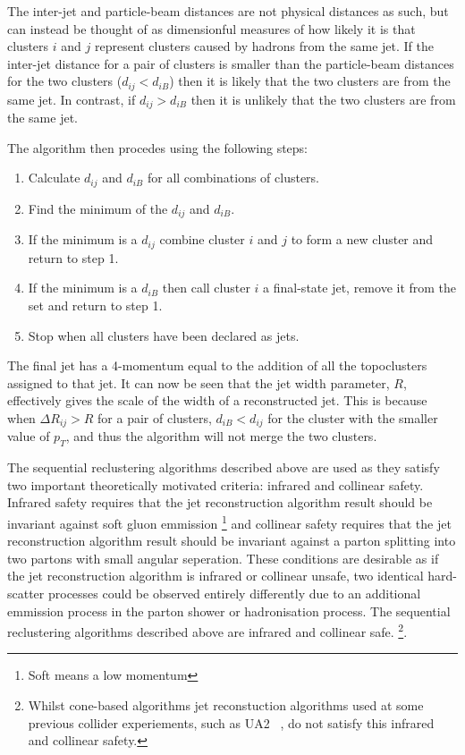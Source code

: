 The inter-jet and particle-beam distances are not physical distances as such, but can instead be thought of as dimensionful measures of how likely it is that
clusters $i$ and $j$ represent clusters caused by hadrons from the same jet.
If the inter-jet distance for a pair of clusters is smaller than the particle-beam distances for the two clusters ($d_{ij} < d_{iB}$) 
then it is likely that the two clusters are from the same jet. 
In contrast, if $d_{ij} > d_{iB}$ then it is unlikely that the two clusters are from the same jet.
 
\noindent The algorithm then procedes using the following steps:
\vspace{-1em}
\begin{enumerate}[nolistsep]
  \item Calculate $d_{ij}$ and $d_{iB}$ for all combinations of clusters.  
  \item Find the minimum of the $d_{ij}$ and $d_{iB}$. 
  \item If the minimum is a $d_{ij}$ combine cluster $i$ and $j$ to form a new cluster and return to step 1. 
  \item If the minimum is a $d_{iB}$ then call cluster $i$ a final-state jet, remove it from the set and return to step 1.  
  \item Stop when all clusters have been declared as jets. 
\end{enumerate} 
The final jet has a 4-momentum equal to the addition of all the topoclusters assigned to that jet.
It can now be seen that the jet width parameter, $R$, effectively gives the scale of the width of a reconstructed jet.
This is because when $\Delta R_{ij} > R$ for a pair of clusters,
$d_{iB} < d_{ij}$ for the cluster with the smaller value of ${p_T}$,
and thus the algorithm will not merge the two clusters.

The sequential reclustering algorithms described above are used as they satisfy two important theoretically motivated criteria:
infrared and collinear safety.
Infrared safety requires that the jet reconstruction algorithm result should be invariant against soft gluon emmission \footnote{Soft means a low momentum}
and collinear safety requires that the jet reconstruction algorithm result should be invariant against a parton splitting into two partons with small angular seperation.
These conditions are desirable as if the jet reconstruction algorithm is infrared or collinear unsafe,
two identical hard-scatter processes could be observed entirely differently due to an additional emmission process in the parton shower or hadronisation process.
The sequential reclustering algorithms described above are infrared and collinear safe.
\footnote{Whilst cone-based algorithms jet reconstuction algorithms used at some previous collider experiements,
  such as UA2 ~\cite{obj-jet_reco_UA2}, do not satisfy this infrared and collinear safety.}.

